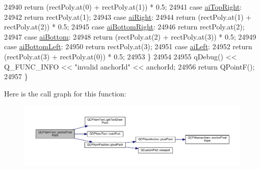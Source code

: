 \begin{DoxyCode}
24940     \textcolor{keywordflow}{return} (rectPoly.at(0) + rectPoly.at(1)) * 0.5;
24941   \textcolor{keywordflow}{case} \hyperlink{class_q_c_p_item_text_a14a84e58f72519c8ae1d7a4a1dd23f21a7b6ff56fcad4c78db0b793a96fce9580}{aiTopRight}:
24942     \textcolor{keywordflow}{return} rectPoly.at(1);
24943   \textcolor{keywordflow}{case} \hyperlink{class_q_c_p_item_text_a14a84e58f72519c8ae1d7a4a1dd23f21ad4faa7def46db6df2fedd1926237b48f}{aiRight}:
24944     \textcolor{keywordflow}{return} (rectPoly.at(1) + rectPoly.at(2)) * 0.5;
24945   \textcolor{keywordflow}{case} \hyperlink{class_q_c_p_item_text_a14a84e58f72519c8ae1d7a4a1dd23f21af2072f259730ef47aa7ad7519f3a0255}{aiBottomRight}:
24946     \textcolor{keywordflow}{return} rectPoly.at(2);
24947   \textcolor{keywordflow}{case} \hyperlink{class_q_c_p_item_text_a14a84e58f72519c8ae1d7a4a1dd23f21a5773ad69b7f4cd2724ba46d8f31b0688}{aiBottom}:
24948     \textcolor{keywordflow}{return} (rectPoly.at(2) + rectPoly.at(3)) * 0.5;
24949   \textcolor{keywordflow}{case} \hyperlink{class_q_c_p_item_text_a14a84e58f72519c8ae1d7a4a1dd23f21a489ec73da5a18c15e98a4f9b17ed301f}{aiBottomLeft}:
24950     \textcolor{keywordflow}{return} rectPoly.at(3);
24951   \textcolor{keywordflow}{case} \hyperlink{class_q_c_p_item_text_a14a84e58f72519c8ae1d7a4a1dd23f21a7f1c1b8c574c753e300a4759915a9170}{aiLeft}:
24952     \textcolor{keywordflow}{return} (rectPoly.at(3) + rectPoly.at(0)) * 0.5;
24953   \}
24954 
24955   qDebug() << Q\_FUNC\_INFO << \textcolor{stringliteral}{"invalid anchorId"} << anchorId;
24956   \textcolor{keywordflow}{return} QPointF();
24957 \}
\end{DoxyCode}


Here is the call graph for this function\+:\nopagebreak
\begin{figure}[H]
\begin{center}
\leavevmode
\includegraphics[width=350pt]{class_q_c_p_item_text_ad248f988534a9d07bc7c220a2457142a_cgraph}
\end{center}
\end{figure}


\hypertarget{class_q_c_p_item_text_a38b981dfacb703efa8e27346eebcb5a2}{}
